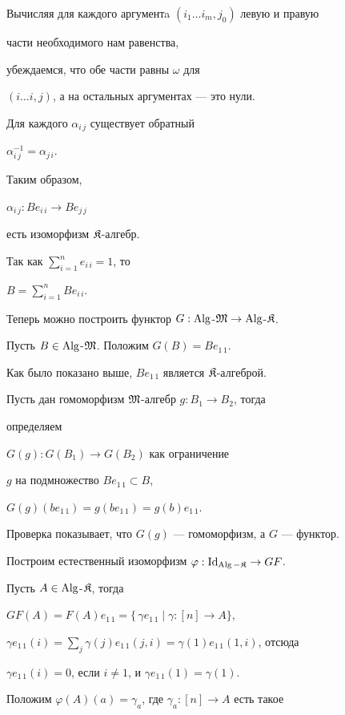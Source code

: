 \begin{pf}
Вычисляя для каждого аргументa $(i_1\dotsc i_m,j_0)$ левую и правую


части необходимого нам равенства,


убеждаемся, что обе части равны $\omega$ для


$(i\dotsc i,j)$, а на остальных аргументах --- это нули.


Для каждого $\alpha_{i\,j}$ существует обратный


$\alpha_{i\,j}^{-1}=\alpha_{j\,i}$.


Таким образом,


$\alpha_{i\,j}:Be_{i\,i}\longrightarrow Be_{j\,j}$


есть изоморфизм $\frak K$-алгебр.


Так как $\sum\limits_{i=1}^n e_{i\,i}=1$, то


$B=\sum\limits_{i=1}^n Be_{i\,i}$.


Теперь можно построить функтор $G:\operatorname{Alg}$-$\frak M\to \operatorname{Alg}$-$\frak K$.


Пусть $B\in \operatorname{Alg}$-$\frak M$. Положим $G(B)=Be_{1\,1}$.


Как было показано выше, $Be_{1\,1}$ является $\frak K$-алгеброй.


Пусть дан гомоморфизм $\frak M$-алгебр $g:B_1\longrightarrow B_2$, тогда


определяем


$G(g):G(B_1)\longrightarrow G(B_2)$ как ограничение


$g$ на подмножество $B e_{1\,1} \subset B$,


$G(g)(be_{1\,1})=g(be_{1\,1})=g(b)e_{1\,1}$.


Проверка показывает, что $G(g)$ --- гомоморфизм, а $G$ --- функтор.





Построим естественный изоморфизм $\varphi:\operatorname{Id}_{\operatorname{Alg}-\frak K} \to GF$.


Пусть $A\in \operatorname{Alg}$-$\frak K$, тогда


$GF(A)=F(A)e_{1\,1}=\{\,\gamma e_{1\,1}\mid \gamma:[n]\to A\}$,


$\gamma e_{1\,1}(i)=\sum\limits_j\gamma (j)e_{1\,1}(j,i)=


\gamma (1)e_{1\,1}(1,i)$, отсюда


$\gamma e_{1\,1}(i)=0$, если $i\ne1$, и $\gamma e_{1\,1}(1)=


\gamma (1)$.


Положим $\varphi (A)(a)=\gamma_a$, где $\gamma_a : [n]\to A$ есть такое



\end{pf}
